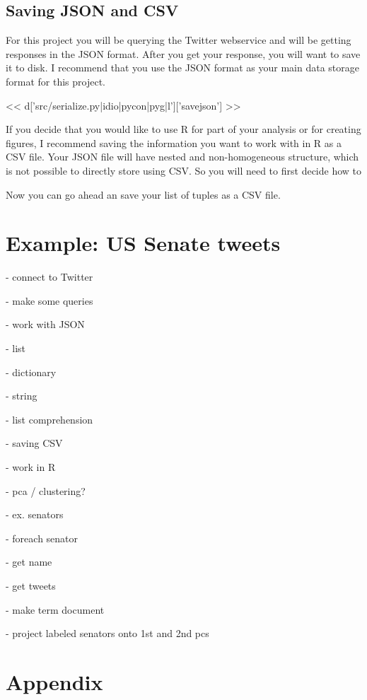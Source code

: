 \subsection*{Saving JSON and CSV}
For this project you will be querying the Twitter webservice and will
be getting responses in the JSON format.  After you get your response,
you will want to save it to disk.  I recommend that you use the JSON
format as your main data storage format for this project.

<< d['src/serialize.py|idio|pycon|pyg|l']['savejson'] >>

If you decide that you would like to use R for part of your analysis or for
creating figures, I recommend saving the information you want to work with in R
as a CSV file.  Your JSON file will have nested and non-homogeneous structure,
which is not possible to directly store using CSV.  So you will need to first
decide how to


Now you can go ahead an save your list of tuples as a CSV file.



\section{Example: US Senate tweets}


- connect to Twitter

- make some queries

- work with JSON

  - list

  - dictionary

  - string

  - list comprehension

- saving CSV

- work in R

  - pca / clustering?

- ex. senators

  - foreach senator

    - get name

    - get tweets

    - make term document

    - project labeled senators onto 1st and 2nd pcs

\newpage
\section*{Appendix}


